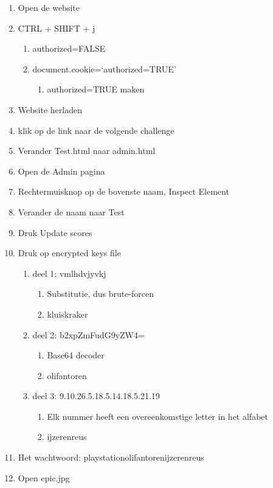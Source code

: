\begin{enumerate}
  \item Open de website
  \item CTRL + SHIFT + j
  	\begin{enumerate}
  	\item authorized=FALSE
  	\item document.cookie=`authorized=TRUE'
  		\begin{enumerate}
  		\item authorized=TRUE maken
  		\end{enumerate}
 	\end{enumerate}
  \item Website herladen
  \item klik op de link naar de volgende challenge
  \item Verander Test.html naar admin.html
  \item Open de Admin pagina
  \item Rechtermuisknop op de bovenste naam, Inspect Element
  \item Verander de naam naar Test
  \item Druk Update scores
  \item Druk op encrypted keys file
  	\begin{enumerate}
  	\item deel 1: vmlhdvjyvkj
  		\begin{enumerate}
  		\item Substitutie, dus brute-forcen
  		\item kluiskraker
  		\end{enumerate}
  	\item deel 2: b2xpZmFudG9yZW4=
  		\begin{enumerate}
  		\item Base64 decoder
  		\item olifantoren
  		\end{enumerate}
  	\item deel 3: 9.10.26.5.18.5.14.18.5.21.19
  		\begin{enumerate}
  		\item Elk nummer heeft een overeenkomstige letter in het alfabet
  		\item ijzerenreus
  		\end{enumerate}
	\end{enumerate} 
  \item Het wachtwoord: playstationolifantorenijzerenreus 
  \item Open epic.jpg
  	\begin{enumerate}

\end{enumerate}
\end{enumerate}
